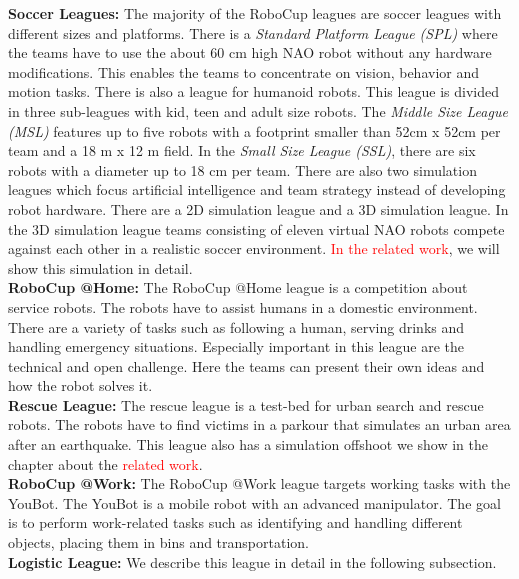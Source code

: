 \textbf{Soccer Leagues:} The majority of the RoboCup leagues are soccer leagues with different sizes and platforms. There is a \textit{Standard Platform League (SPL)} where the teams have to use the about 60 cm high NAO robot without any hardware modifications. This enables the teams to concentrate on vision, behavior and motion tasks. There is also a league for humanoid robots. This league is divided in three sub-leagues with kid, teen and adult size robots. The \textit{Middle Size League (MSL)} features up to five robots with a footprint smaller than 52cm x 52cm per team and a 18 m x 12 m field. In the \textit{Small Size League (SSL)}, there are six robots with a diameter up to 18 cm per team. There are also two simulation leagues which focus artificial intelligence and team strategy instead of developing robot hardware. There are a 2D simulation league and a 3D simulation league. In the 3D simulation league teams consisting of eleven virtual NAO robots compete against each other in a realistic soccer environment. \textcolor{red}{In the related work}, we will show this simulation in detail.\\
\textbf{RoboCup @Home:} The RoboCup @Home league is a competition about service robots. The robots have to assist humans in a domestic environment. There are a variety of tasks such as following a human, serving drinks and handling emergency situations. Especially important in this league are the technical and open challenge. Here the teams can present their own ideas and how the robot solves it.\\
\textbf{Rescue League:} The rescue league is a test-bed for urban search and rescue robots. The robots have to find victims in a parkour that simulates an urban area after an earthquake. This league also has a simulation offshoot we show in the chapter about the \textcolor{red}{related work}.\\
\textbf{RoboCup @Work:} The RoboCup @Work league targets working tasks with the YouBot. The YouBot is a mobile robot with an advanced manipulator. The goal is to perform work-related tasks such as identifying and handling different objects, placing them in bins and transportation.\\
\textbf{Logistic League:} We describe this league in detail in the following subsection.\\

